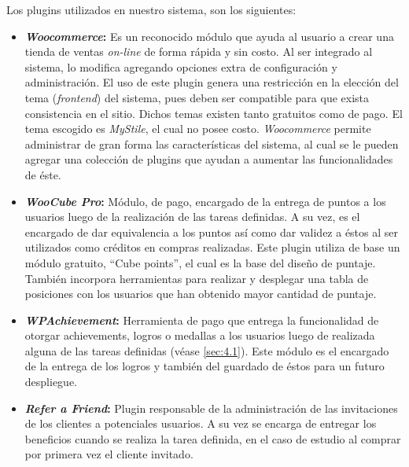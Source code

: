Los plugins utilizados en nuestro sistema, son los siguientes:

\begin{itemize}

    \item {\bf \emph{Woocommerce}:}
        Es un reconocido módulo que ayuda al usuario a crear una tienda de
        ventas \emph{on-line} de forma rápida y sin costo.
        Al ser integrado al sistema, lo modifica agregando opciones
        extra de configuración y administración.
        El uso de este plugin genera una restricción en la elección
        del tema (\emph{frontend}) del sistema, pues deben ser compatible
        para que exista consistencia en el sitio.
        Dichos temas existen tanto gratuitos como de pago.
        El tema escogido es \emph{MyStile}, el cual no posee costo.
        \emph{Woocommerce} permite administrar de gran forma las características del
        sistema, al cual se le pueden agregar una colección de plugins que ayudan a
        aumentar las funcionalidades de éste.

    \item {\bf \emph{WooCube Pro}:}
        Módulo, de pago, encargado de la entrega de puntos a los usuarios luego de
        la realización de las tareas definidas.
        A su vez, es el encargado de dar equivalencia a los puntos así como dar
        validez a éstos al ser utilizados como créditos en compras realizadas.
        Este plugin utiliza de base un módulo gratuito, ``Cube points'',
        el cual es la base del diseño de puntaje.
        También incorpora herramientas para realizar y desplegar una tabla
        de posiciones con los usuarios que han obtenido mayor cantidad de puntaje.

    \item {\bf \emph{WPAchievement}:}
        Herramienta de pago que entrega la funcionalidad de otorgar achievements,
        logros o medallas a los usuarios luego de realizada alguna de las tareas
        definidas (véase \ref{sec:4.1}).
        Este módulo es el encargado de la entrega de los logros y también del
        guardado de éstos para un futuro despliegue.

    \item {\bf \emph{Refer a Friend}:}
        Plugin responsable de la administración de las invitaciones de los
        clientes a potenciales usuarios.
        A su vez se encarga de entregar los beneficios cuando se realiza la tarea
        definida, en el caso de estudio al comprar por primera vez el cliente
        invitado.

\end{itemize}

